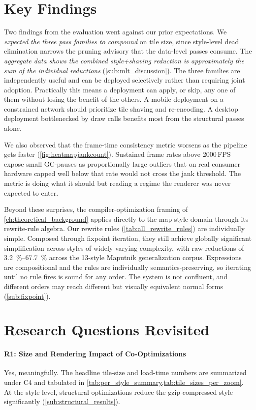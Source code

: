 \section{Key Findings}

Two findings from the evaluation went against our prior expectations.
We \emph{expected the three pass families to compound} on tile size, since style-level dead elimination narrows the pruning advisory that the data-level passes consume.
The \emph{aggregate data shows the combined style+shaving reduction is approximately the sum of the individual reductions} (\cref{sub:mlt_discussion}).
The three families are independently useful and can be deployed selectively rather than requiring joint adoption.
Practically this means a deployment can apply, or skip, any one of them without losing the benefit of the others.
A mobile deployment on a constrained network should prioritize tile shaving and re-encoding.
A desktop deployment bottlenecked by draw calls benefits most from the structural passes alone.

We also observed that the frame-time consistency metric worsens as the pipeline gets faster (\cref{fig:heatmapjankcount}).
Sustained frame rates above 2000\,\ac{FPS} expose small \ac{GC}-pauses as proportionally large outliers that on real consumer hardware capped well below that rate would not cross the jank threshold.
The metric is doing what it should but reading a regime the renderer was never expected to enter.

Beyond these surprises, the compiler-optimization framing of \cref{ch:theoretical_background} applies directly to the map-style domain through its rewrite-rule algebra.
Our rewrite rules (\cref{tab:all_rewrite_rules}) are individually simple.
Composed through fixpoint iteration, they still achieve globally significant simplification across styles of widely varying complexity, with raw reductions of \qtyrange{3.2}{67.7}{\percent} across the 13-style Maputnik generalization corpus.
Expressions are compositional and the rules are individually semantics-preserving, so iterating until no rule fires is sound for any order.
The system is not confluent, and different orders may reach different but visually equivalent normal forms (\cref{sub:fixpoint}).

\section{Research Questions Revisited}\label{sec:rq_revisited}

\paragraph{R1: Size and Rendering Impact of Co-Optimizations}
Yes, meaningfully.
The headline tile-size and load-time numbers are summarized under C4 and tabulated in \cref{tab:per_style_summary,tab:tile_sizes_per_zoom}.
At the style level, structural optimizations reduce the gzip-compressed style significantly (\cref{sub:structural_results}).

